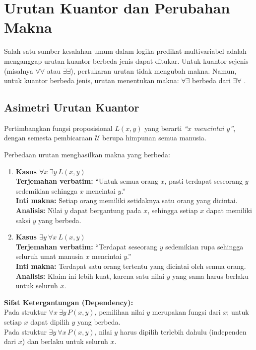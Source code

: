 \section{Urutan Kuantor dan Perubahan Makna}

Salah satu sumber kesalahan umum dalam logika predikat multivariabel adalah menganggap urutan kuantor berbeda jenis dapat ditukar. Untuk kuantor sejenis (misalnya $\forall\forall$ atau $\exists\exists$), pertukaran urutan tidak mengubah makna. Namun, untuk kuantor berbeda jenis, urutan menentukan makna: $\forall\exists$ berbeda dari $\exists\forall$ \cite{rosen2019}.

\subsection{Asimetri Urutan Kuantor}

Pertimbangkan fungsi proposisional $L(x,y)$ yang berarti \textit{``$x$ mencintai $y$''}, dengan semesta pembicaraan $\mathcal{U}$ berupa himpunan semua manusia.

Perbedaan urutan menghasilkan makna yang berbeda:

\begin{enumerate}
    \item \textbf{Kasus $\forall x \ \exists y \ L(x, y)$} \\
    \textbf{Terjemahan verbatim:} ``Untuk semua orang $x$, pasti terdapat seseorang $y$ sedemikian sehingga $x$ mencintai $y$.'' \\
    \textbf{Inti makna:} Setiap orang memiliki setidaknya satu orang yang dicintai. \\
    \textbf{Analisis:} Nilai $y$ dapat bergantung pada $x$, sehingga setiap $x$ dapat memiliki saksi $y$ yang berbeda.
    
    \item \textbf{Kasus $\exists y \ \forall x \ L(x, y)$} \\
    \textbf{Terjemahan verbatim:} ``Terdapat seseorang $y$ sedemikian rupa sehingga seluruh umat manusia $x$ mencintai $y$.'' \\
    \textbf{Inti makna:} Terdapat satu orang tertentu yang dicintai oleh semua orang. \\
    \textbf{Analisis:} Klaim ini lebih kuat, karena satu nilai $y$ yang sama harus berlaku untuk seluruh $x$.
\end{enumerate}

\begin{konsep}
\textbf{Sifat Ketergantungan (Dependency):} \\
Pada struktur $\forall x \ \exists y \, P(x, y)$, pemilihan nilai $y$ merupakan fungsi dari $x$; untuk setiap $x$ dapat dipilih $y$ yang berbeda.\\
Pada struktur $\exists y \ \forall x \, P(x, y)$, nilai $y$ harus dipilih terlebih dahulu (independen dari $x$) dan berlaku untuk seluruh $x$.
\end{konsep}

